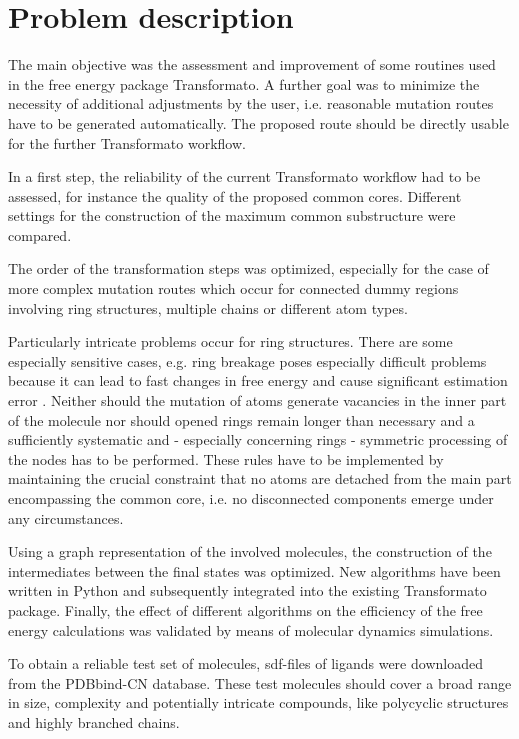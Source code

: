 \chapter{Problem description }

The main objective was the assessment and improvement of some routines
used in the free energy package Transformato. A further goal was to
minimize the necessity of additional adjustments by the user, i.e.
reasonable mutation routes have to be generated automatically. The
proposed route should be directly usable for the further Transformato
workflow.

In a first step, the reliability of the current Transformato workflow
had to be assessed, for instance the quality of the proposed common
cores. Different settings for the construction of the maximum common
substructure were compared. 

The order of the transformation steps was optimized, especially
for the case of more complex mutation routes which occur for connected
dummy regions involving ring structures, multiple chains or different
atom types. 

Particularly intricate problems occur for ring structures. There are
some especially sensitive cases, e.g. ring breakage poses especially
difficult problems because it can lead to fast changes in free energy
and cause significant estimation error \cite{Liu.2015}. Neither should
the mutation of atoms generate vacancies in the inner part of the
molecule nor should opened rings remain longer than necessary and
a sufficiently systematic and - especially concerning rings - symmetric
processing of the nodes has to be performed. These rules have to be
implemented by maintaining the crucial constraint that no atoms are
detached from the main part encompassing the common core, i.e. no
disconnected components emerge under any circumstances.

Using a graph representation of the involved molecules, the construction
of the intermediates between the final states was optimized.
New algorithms have been written in Python and subsequently integrated
into the existing Transformato package. Finally, the effect of different
algorithms on the efficiency of the free energy calculations was validated by means of molecular dynamics simulations. 

To obtain a reliable test set of molecules, sdf-files of ligands were downloaded from the PDBbind-CN database. These test molecules should cover a
broad range in size, complexity and potentially intricate compounds,
like polycyclic structures and highly branched chains.

